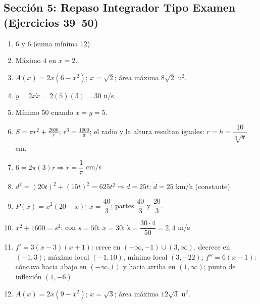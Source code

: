 \documentclass[12pt, letterpaper]{article}
\begin{document}
  \subsection*{Sección 5: Repaso Integrador Tipo Examen (Ejercicios 39--50)}
  \begin{enumerate}[resume=respuestas, leftmargin=*, label=\textbf{\arabic*.}]
    \item $6$ y $6$ (suma mínima 12)
    \item Máximo $4$ en $x = 2$.
    \item $A(x) = 2x(6 - x^2)$; $x = \sqrt{2}$; área máxima $8\sqrt{2}$ u$^2$.
    \item $\dot{y} = 2x\dot{x} = 2(5)(3) = 30$ u/s
    \item Mínimo $50$ cuando $x = y = 5$.
    \item $S = \pi r^2 + \frac{2000}{r}$; $r^3 = \frac{1000}{\pi}$; el radio y la altura resultan iguales: $r = h = \dfrac{10}{\sqrt[3]{\pi}}$ cm.
    \item $6 = 2\pi(3)\dot{r} \Rightarrow \dot{r} = \dfrac{1}{\pi}$ cm/s
    \item $d^2 = (20t)^2 + (15t)^2 = 625t^2 \Rightarrow d = 25t$; $\dot{d} = 25$ km/h (constante)
    \item $P(x) = x^2(20 - x)$; $x = \dfrac{40}{3}$; partes $\dfrac{40}{3}$ y $\dfrac{20}{3}$.
    \item $x^2 + 1600 = s^2$; con $s = 50$: $x = 30$; $\dot{s} = \dfrac{30 \cdot 4}{50} = 2{,}4$ m/s
    \item $f' = 3(x - 3)(x + 1)$: crece en $(-\infty, -1) \cup (3, \infty)$, decrece en $(-1, 3)$; máximo local $(-1, 10)$, mínimo local $(3, -22)$; $f'' = 6(x - 1)$: cóncava hacia abajo en $(-\infty, 1)$ y hacia arriba en $(1, \infty)$; punto de inflexión $(1, -6)$.
    \item $A(x) = 2x(9 - x^2)$; $x = \sqrt{3}$; área máxima $12\sqrt{3}$ u$^2$.
  \end{enumerate}
\fi
\end{document}

